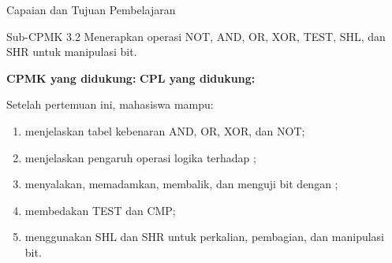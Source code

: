 \documentclass[aspectratio=169,11pt]{beamer}
\begin{document}

\begin{frame}{Capaian dan Tujuan Pembelajaran}
\begin{block}{Sub-CPMK 3.2}
\footnotesize Menerapkan operasi NOT, AND, OR, XOR, TEST, SHL, dan
SHR untuk manipulasi bit.
\end{block}

\vspace{0.1em}
{\small\textbf{CPMK yang didukung:} \quad\textbullet\quad
\textbf{CPL yang didukung:} \par}

\vspace{0.15em}
\begin{exampleblock}{Setelah pertemuan ini, mahasiswa mampu:}
\footnotesize
\begin{enumerate}
    \item menjelaskan tabel kebenaran AND, OR, XOR, dan NOT;
    \item menjelaskan pengaruh operasi logika terhadap ;
    \item menyalakan, memadamkan, membalik, dan menguji bit dengan
          ;
    \item membedakan TEST dan CMP;
    \item menggunakan SHL dan SHR untuk perkalian, pembagian, dan
          manipulasi bit.
\end{enumerate}
\end{exampleblock}
\end{frame}
\end{document}
